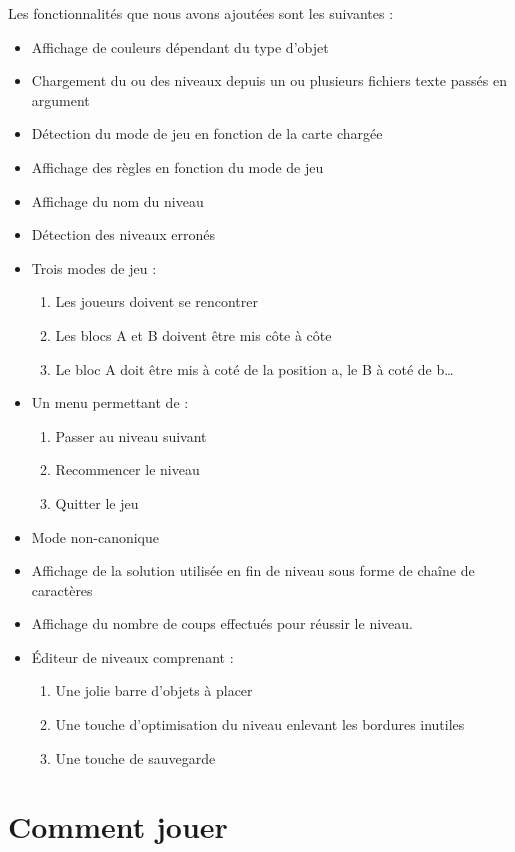 \documentclass{article}
\begin{document}
Les fonctionnalités que nous avons ajoutées sont les suivantes :
\begin{itemize}
    \item Affichage de couleurs dépendant du type d'objet
    \item Chargement du ou des niveaux depuis un ou plusieurs fichiers texte passés en argument
    \item Détection du mode de jeu en fonction de la carte chargée
    \item Affichage des règles en fonction du mode de jeu
    \item Affichage du nom du niveau
    \item Détection des niveaux erronés
    \item Trois modes de jeu :
    \begin{enumerate}
        \item Les joueurs doivent se rencontrer
        \item Les blocs A et B doivent être mis côte à côte
        \item Le bloc A doit être mis à coté de la position a, le B à coté de b…
    \end{enumerate}
    \item Un menu permettant de :
    \begin{enumerate}
        \item Passer au niveau suivant
        \item Recommencer le niveau
        \item Quitter le jeu
    \end{enumerate}
    \item Mode non-canonique
    \item Affichage de la solution utilisée en fin de niveau sous forme de chaîne de caractères
    \item Affichage du nombre de coups effectués pour réussir le niveau.
    \item Éditeur de niveaux comprenant :
    \begin{enumerate}
        \item Une jolie barre d'objets à placer
        \item Une touche d'optimisation du niveau enlevant les bordures inutiles
        \item Une touche de sauvegarde
    \end{enumerate}
\end{itemize}

\section{Comment jouer}
\end{document}

